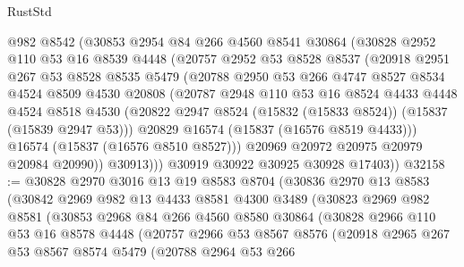\begin{lexlean}{RustStd}
\begin{coremodule}
{\begin{coremodule}
{{{{{{{{{{{{{{{{{{{{{{{{{{{{{{{{{{{{{{{{{{{{{{{{{{{{{{{{{{{{          @982
          @8542
          (@30853
            @2954
            @84
            @266
            @4560
            @8541
            @30864
            (@30828
              @2952
              @110
              @53
              @16
              @8539
              @4448
              (@20757
                @2952
                @53
                @8528
                @8537
                (@20918
                  @2951
                  @267
                  @53
                  @8528
                  @8535
                  @5479
                  (@20788
                    @2950
                    @53
                    @266
                    @4747
                    @8527
                    @8534
                    @4524
                    @8509
                    @4530
                    @20808
                    (@20787
                      @2948
                      @110
                      @53
                      @16
                      @8524
                      @4433
                      @4448
                      @4524
                      @8518
                      @4530
                      (@20822 @2947 @8524 (@15832 (@15833 @8524)) (@15837 (@15839 @2947 @53)))
                      @20829
                      @16574
                      (@15837 (@16576 @8519 @4433)))
                    @16574
                    (@15837 (@16576 @8510 @8527)))
                  @20969
                  @20972
                  @20975
                  @20979
                  @20984
                  @20990))
              @30913)))
        @30919
        @30922
        @30925
        @30928
        @17403))
@32158 := @30828
    @2970
    @3016
    @13
    @19
    @8583
    @8704
    (@30836
      @2970
      @13
      @8583
      (@30842
        @2969
        @982
        @13
        @4433
        @8581
        @4300
        @3489
        (@30823
          @2969
          @982
          @8581
          (@30853
            @2968
            @84
            @266
            @4560
            @8580
            @30864
            (@30828
              @2966
              @110
              @53
              @16
              @8578
              @4448
              (@20757
                @2966
                @53
                @8567
                @8576
                (@20918
                  @2965
                  @267
                  @53
                  @8567
                  @8574
                  @5479
                  (@20788
                    @2964
                    @53
                    @266
}}}}}}}}}}}}}}}}}}}}}}}}}}}}}}}}}}}}}}}}}}}}}}}}}}}}}}}}}}}}
\end{coremodule}}
\end{coremodule}
\end{lexlean}

